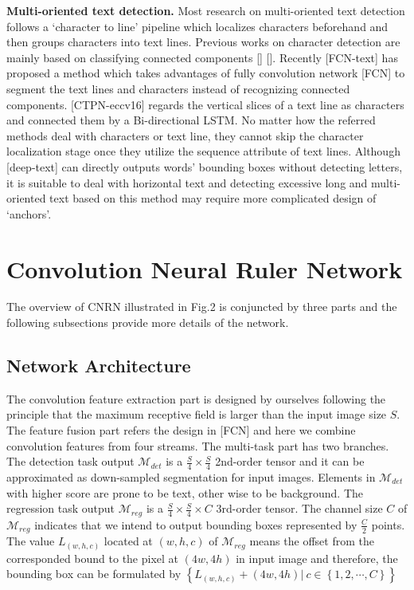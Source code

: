 \documentclass[10pt,twocolumn,letterpaper]{article}
\begin{document}
	\noindent \textbf{Multi-oriented text detection.}
	Most research on multi-oriented text detection follows a `character to line' pipeline which localizes characters beforehand and then groups characters into text lines. Previous works on character detection are mainly based on classifying connected components [] []. Recently [FCN-text] has proposed a method which takes advantages of fully convolution network [FCN] to segment the text lines and characters instead of recognizing connected components. [CTPN-eccv16] regards the vertical slices of a text line as characters and connected them by a Bi-directional LSTM. No matter how the referred methods deal with characters or text line, they cannot skip the character localization stage once they utilize the sequence attribute of text lines. Although [deep-text] can directly outputs words' bounding boxes without detecting letters, it is suitable to deal with horizontal text and detecting excessive long and multi-oriented text based on this method may require more complicated design of `anchors'.



\section{Convolution Neural Ruler Network}
	The overview of CNRN illustrated in Fig.2 is conjuncted by three parts and the following subsections provide more details of the network.
	\subsection{Network Architecture}
	The convolution feature extraction part is designed by ourselves following the principle that the maximum receptive field is larger than the input image size $S$. 
	The feature fusion part refers the design in [FCN] and here we combine convolution features from four streams. 
	The multi-task part has two branches. 
	The detection task output $\mathcal{M}_{det}$ is a $\frac{S}{4} \times \frac{S}{4}$ 2nd-order tensor and it can be approximated as down-sampled segmentation for input images. Elements in $\mathcal{M}_{det}$ with higher score are prone to be text, other wise to be background.
	The regression task output $\mathcal{M}_{reg}$ is a $\frac{S}{4} \times \frac{S}{4} \times C$ 3rd-order tensor. The channel size $C$ of $\mathcal{M}_{reg}$ indicates that we intend to output bounding boxes represented by $\frac{C}{2}$ points. The value $L_{\left(w, h, c\right)}$ located at $\left(w, h, c\right)$ of $\mathcal{M}_{reg}$ means the offset from the corresponded bound to the pixel at $\left(4w, 4h\right)$ in input image and therefore, the bounding box can be formulated by 
	$\left\{ L_{\left(w, h, c\right)} + \left(4w, 4h\right) \vert \ c \in \left\{1, 2, \cdots, C \right\} \right\}$
\end{document}
